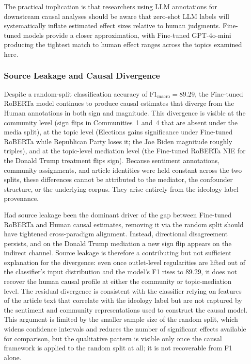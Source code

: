 The practical implication is that researchers using LLM annotations for downstream causal analyses should be aware that zero-shot LLM labels will systematically inflate estimated effect sizes relative to human judgments. Fine-tuned models provide a closer approximation, with Fine-tuned GPT-4o-mini producing the tightest match to human effect ranges across the topics examined here.

\subsubsection{Source Leakage and Causal Divergence}

Despite a random-split classification accuracy of $\text{F1}_{\text{macro}} = 89.29$, the Fine-tuned RoBERTa model continues to produce causal estimates that diverge from the Human annotations in both sign and magnitude. This divergence is visible at the community level (sign flips in Communities~1 and~4 that are absent under the media split), at the topic level (Elections gains significance under Fine-tuned RoBERTa while Republican Party loses it; the Joe Biden magnitude roughly triples), and at the topic-level mediation level (the Fine-tuned RoBERTa NIE for the Donald Trump treatment flips sign). Because sentiment annotations, community assignments, and article identities were held constant across the two splits, these differences cannot be attributed to the mediator, the confounder structure, or the underlying corpus. They arise entirely from the ideology-label provenance.

Had source leakage been the dominant driver of the gap between Fine-tuned RoBERTa and Human causal estimates, removing it via the random split should have tightened cross-paradigm alignment. Instead, directional disagreement persists, and on the Donald Trump mediation a new sign flip appears on the indirect channel. Source leakage is therefore a contributing but not sufficient explanation for the divergence: even once outlet-level regularities are lifted out of the classifier's input distribution and the model's F1 rises to $89.29$, it does not recover the human causal profile at either the community or topic-mediation level. The residual divergence is consistent with the classifier relying on features of the article text that correlate with the ideology label but are not captured by the sentiment and community representations used to construct the causal model. This argument is limited by the smaller sample size of the random split, which widens confidence intervals and reduces the number of significant effects available for comparison, but the qualitative pattern is visible only once the causal framework is applied to the random split at all; it is not recoverable from F1 alone. 

